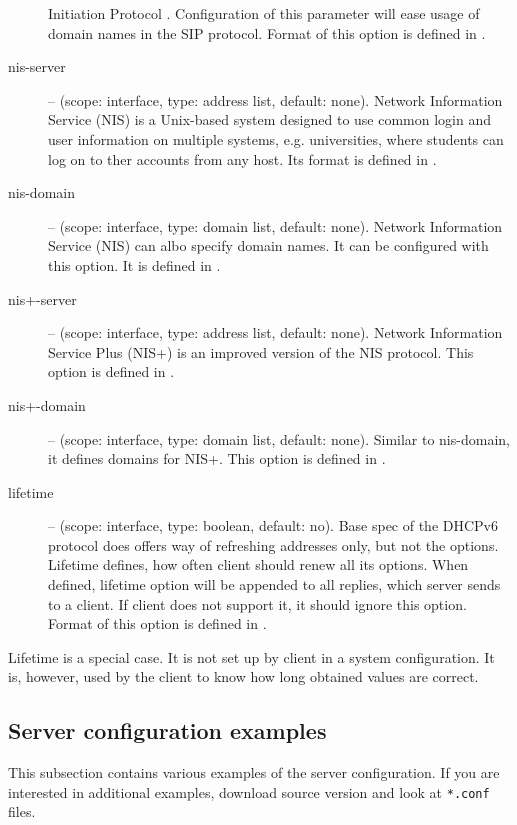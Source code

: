 \begin{description}
	    Initiation Protocol \cite{rfc3263}. Configuration of this
	    parameter will ease usage of domain names in the SIP
	    protocol. Format of this option is defined in
	    \cite{rfc3319}.
 \item[nis-server] -- (scope: interface, type: address list, default:
	    none). Network Information Service (NIS) is a Unix-based
	    system designed to use common login and user information on
	    multiple systems, e.g. universities, where students can log
	    on to ther accounts from any host. Its format is defined
            in \cite{rfc3898}.
 \item[nis-domain] -- (scope: interface, type: domain list, default:
	    none). Network Information Service (NIS) can albo specify
	    domain names. It can be configured with this option. It is
	    defined in \cite{rfc3898}.
 \item[nis+-server] -- (scope: interface, type: address list, default:
	    none). Network Information Service Plus (NIS+) is an
	    improved version of the NIS protocol. This option is defined
	    in \cite{rfc3898}.
 \item[nis+-domain] -- (scope: interface, type: domain list, default:
	    none). Similar to nis-domain, it defines domains for
	    NIS+. This option is defined in \cite{rfc3898}.
 \item[lifetime] -- (scope: interface, type: boolean, default: no). Base
	    spec of the DHCPv6 protocol does offers way of refreshing
	    addresses only, but not the options. Lifetime defines, how
	    often client should renew all its options. When defined,
            lifetime option will be appended to all replies, which
            server sends to a client. If client does not support it,
            it should ignore this option. Format of
	    this option is defined in \cite{draft-lifetime}.
\end{description}

Lifetime is a special case. It is not set up by client in a system
configuration. It is, however, used by the client to know how long
obtained values are correct.

\subsection{Server configuration examples}

This subsection contains various examples of the server
configuration. If you are interested in additional examples, download source version
and look at \verb+*.conf+ files.


